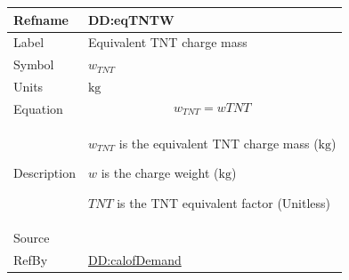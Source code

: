\documentclass[12pt]{article}
\begin{document}
\medskip
\noindent
\begin{minipage}{\textwidth}
\begin{tabular}{>{\raggedright}p{}>{\raggedright\arraybackslash}p{}}
\toprule \textbf{Refname} & \textbf{DD:eqTNTW}
\label{DD:eqTNTW}
\\ \midrule
Label & Equivalent TNT charge mass
        
\\ \midrule
Symbol & ${w_{\mathit{TNT}}}$
         
\\ \midrule
Units & ${\text{kg}}$
        
\\ \midrule
Equation & \begin{displaymath}
           {w_{\mathit{TNT}}}=w \mathit{TNT}
           \end{displaymath}
\\ \midrule
Description & \begin{symbDescription}
              \item{${w_{\mathit{TNT}}}$ is the equivalent TNT charge mass (${\text{kg}}$)}
              \item{$w$ is the charge weight (${\text{kg}}$)}
              \item{$\mathit{TNT}$ is the TNT equivalent factor (Unitless)}
              \end{symbDescription}
\\ \midrule
Source & \cite{astm2009}
         
\\ \midrule
RefBy & \hyperref[DD:calofDemand]{DD:calofDemand}
        
\\ \bottomrule
\end{tabular}
\end{minipage}
\end{document}
